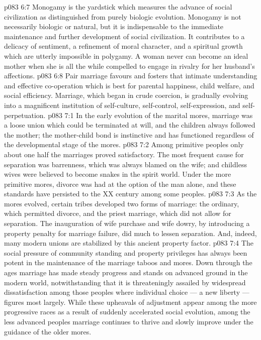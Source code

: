 \vs p083 6:7 Monogamy is the yardstick which measures the advance of social civilization as distinguished from purely biologic evolution. Monogamy is not necessarily biologic or natural, but it is indispensable to the immediate maintenance and further development of social civilization. It contributes to a delicacy of sentiment, a refinement of moral character, and a spiritual growth which are utterly impossible in polygamy. A woman never can become an ideal mother when she is all the while compelled to engage in rivalry for her husband’s affections.
\vs p083 6:8 Pair marriage favours and fosters that intimate understanding and effective co\hyp{}operation which is best for parental happiness, child welfare, and social efficiency. Marriage, which began in crude coercion, is gradually evolving into a magnificent institution of self\hyp{}culture, self\hyp{}control, self\hyp{}expression, and self\hyp{}perpetuation.
\vs p083 7:1 In the early evolution of the marital mores, marriage was a loose union which could be terminated at will, and the children always followed the mother; the mother\hyp{}child bond is instinctive and has functioned regardless of the developmental stage of the mores.
\vs p083 7:2 Among primitive peoples only about one half the marriages proved satisfactory. The most frequent cause for separation was barrenness, which was always blamed on the wife; and childless wives were believed to become snakes in the spirit world. Under the more primitive mores, divorce was had at the option of the man alone, and these standards have persisted to the XX century among some peoples.
\vs p083 7:3 As the mores evolved, certain tribes developed two forms of marriage: the ordinary, which permitted divorce, and the priest marriage, which did not allow for separation. The inauguration of wife purchase and wife dowry, by introducing a property penalty for marriage failure, did much to lessen separation. And, indeed, many modern unions are stabilized by this ancient property factor.
\vs p083 7:4 The social pressure of community standing and property privileges has always been potent in the maintenance of the marriage taboos and mores. Down through the ages marriage has made steady progress and stands on advanced ground in the modern world, notwithstanding that it is threateningly assailed by widespread dissatisfaction among those peoples where individual choice --- a new liberty --- figures most largely. While these upheavals of adjustment appear among the more progressive races as a result of suddenly accelerated social evolution, among the less advanced peoples marriage continues to thrive and slowly improve under the guidance of the older mores.
